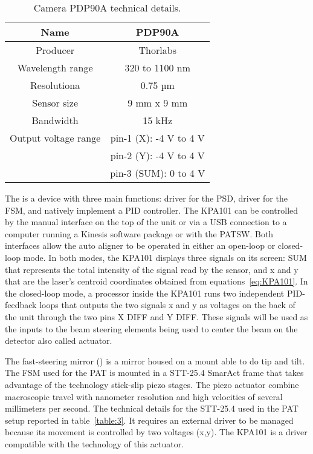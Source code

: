 \begin{table}[h!]
      \centering
      \begin{tabular}{ |c|c| }
            \hline
            Name                 & PDP90A                 \\\hline
            Producer             & Thorlabs               \\\hline
            Wavelength range     & 320 to 1100 nm         \\\hline
            Resolutiona          & 0.75 µm                \\\hline
            Sensor size          & 9 mm x 9 mm            \\\hline
            Bandwidth            & 15 kHz                 \\\hline
            Output voltage range & pin-1 (X): -4 V to 4 V \\
                                 & pin-2 (Y): -4 V to 4 V \\
                                 & pin-3 (SUM): 0 to 4 V  \\\hline
      \end{tabular}
      \caption{Camera PDP90A technical details.}
      \label{table:2}
\end{table}

The  is a device with three main functions: driver for the PSD, driver for the FSM, and natively implement a PID controller.
The KPA101 can be controlled by the manual interface on the top of the unit or via a USB connection to a computer running a Kinesis software package or with the PATSW.
Both interfaces allow the auto aligner to be operated in either an open-loop or closed-loop mode.
In both modes, the KPA101 displays three signals on its screen: SUM that represents the total intensity of the signal read by the sensor, and x and y that are the laser's centroid coordinates obtained from equations~\ref{eq:KPA101}.
In the closed-loop mode, a processor inside the KPA101 runs two independent PID-feedback loops that outputs the two signals x and y as voltages on the back of the unit through the two pins X DIFF and Y DIFF. These signals will be used as the inputs to the beam steering elements being used to center the beam on the detector also called actuator.

The fast-steering mirror () is a mirror housed on a mount able to do tip and tilt.
The FSM used for the PAT is mounted in a STT-25.4 SmarAct frame that takes advantage of the technology stick-slip piezo stages. The piezo actuator combine macroscopic travel with nanometer resolution and high velocities of several millimeters per second. The technical details for the STT-25.4 used in the PAT setup reported in table~\ref{table:3}.
It requires an external driver to be managed because its movement is controlled by two voltages (x,y). The KPA101 is a driver compatible with the technology of this actuator.


